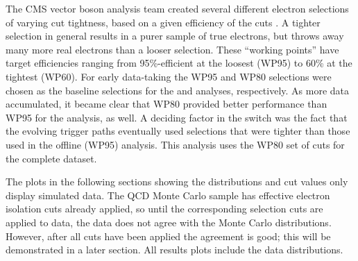 The CMS vector boson analysis team created several different electron selections of varying 
cut tightness,
based on a given efficiency of the cuts \cite{CMSWZ}.  %
A tighter selection in general results in a purer sample of true electrons, but throws away many more
real electrons than a looser selection.  
These ``working points'' have target efficiencies ranging from 95\%-efficient at the loosest (WP95) to 60\% at the tightest (WP60).  
For early data-taking the WP95 and WP80 selections were chosen as the baseline selections for the \Zee and \Wenu analyses, respectively.
As more data accumulated, it became clear that WP80 provided better performance than WP95 for the \Zee analysis, as well.  
A deciding factor in the switch was the fact that the evolving trigger paths eventually used selections that were
tighter than those used in the offline (WP95) analysis.  
This analysis uses the WP80 set of cuts for the complete dataset.  

The plots in the following sections showing the distributions and cut values 
only display simulated data.  
The QCD Monte Carlo sample has effective electron isolation cuts already applied, 
so until the corresponding selection cuts are applied to data, 
the data does not agree with the Monte Carlo distributions.  
However, after all cuts have been applied the agreement is good; 
this will be demonstrated in a later section.  
All results plots include the data distributions.  


